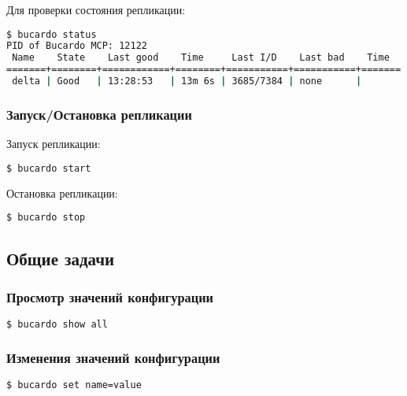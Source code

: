 Для проверки состояния репликации:

\begin{lstlisting}[language=Bash,label=lst:bucardo-master-slave2,caption=Проверка состояния репликации]
$ bucardo status
PID of Bucardo MCP: 12122
 Name    State    Last good    Time     Last I/D    Last bad    Time
=======+========+============+========+===========+===========+=======
 delta | Good   | 13:28:53   | 13m 6s | 3685/7384 | none      |
\end{lstlisting}

\subsubsection{Запуск/Остановка репликации}

Запуск репликации:

\begin{lstlisting}[language=Bash,label=lst:bucardo11,caption=Запуск репликации]
$ bucardo start
\end{lstlisting}

Остановка репликации:

\begin{lstlisting}[language=Bash,label=lst:bucardo12,caption=Остановка репликации]
$ bucardo stop
\end{lstlisting}

\subsection{Общие задачи}

\subsubsection{Просмотр значений конфигурации}

\begin{lstlisting}[language=Bash,label=lst:bucardo13,caption=Просмотр значений конфигурации]
$ bucardo show all
\end{lstlisting}

\subsubsection{Изменения значений конфигурации}

\begin{lstlisting}[language=Bash,label=lst:bucardo14,caption=Изменения значений конфигурациии]
$ bucardo set name=value
\end{lstlisting}

